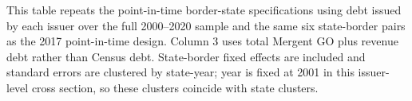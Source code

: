 \newpage
\begin{table}[H]\centering
\caption{\textbf{Debt Choice and Aggregate Yields: Full-Period Border-State Issuer Aggregates}}
\label{tab:debt_choice_border_state_issuer_aggregate}
\parbox{\textwidth}{This table repeats the point-in-time border-state specifications using debt issued by each issuer over the full 2000--2020 sample and the same six state-border pairs as the 2017 point-in-time design. Column 3 uses total Mergent GO plus revenue debt rather than Census debt. State-border fixed effects are included and standard errors are clustered by state-year; year is fixed at 2001 in this issuer-level cross section, so these clusters coincide with state clusters.}
\end{table}


